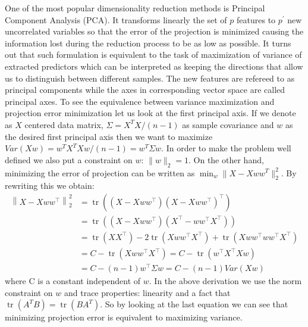 \documentclass[shortabstract, english, mgr]{iithesis}
\begin{document}
One of the most popular dimensionality reduction methods is Principal Component Analysis (PCA). It transforms linearly the set of $p$ features to $p^{\prime}$ new uncorrelated variables so that the error of the projection is minimized causing the information lost during the reduction process to be as low as possible. It turns out that such formulation is equivalent to the task of maximization of variance of extracted predictors which can be interpreted as keeping the directions that allow us to distinguish between different samples. The new features are refereed to as principal components while the axes in corresponding vector space are called principal axes. To see the equivalence between variance maximization and projection error minimization let us look at the first principal axis. If we denote as $X$ centered data matrix, $\Sigma = X^TX/(n-1)$ as sample covariance and $w$ as the desired first principal axis then we want to maximize $Var(Xw) = w^TX^TXw/(n-1) = w^T\Sigma w$. In order to make the problem well defined we also put a constraint on $w$: $\|w\|_2 = 1$. On the other hand, minimizing the error of projection can be written as $\min_w \| X - X ww^T\|_2^2$. By rewriting this we obtain: 
\begin{align*}
\left\|X-X w w^{\top}\right\|^{2}_2 &=\operatorname{tr}\left(\left(X-X w w^{\top}\right)\left(X-X w w^{\top}\right)^{\top}\right) \\ &=\operatorname{tr}\left(\left(X-X w w^{\top}\right)\left(X^{\top}-w w^{\top} X^{\top}\right)\right) \\ &=\operatorname{tr}\left(X X^{\top}\right)-2 \operatorname{tr}\left(X w w^{\top} X^{\top}\right)+\operatorname{tr}\left(X w w^{\top} w w^{\top} X^{\top}\right) \\ &=C-\operatorname{tr}\left(X w w^{\top} X^{\top}\right)=C-\operatorname{tr}\left(w^{\top} X^{\top} X w\right) \\ &=C-(n-1)w^{\top} \Sigma w = C - (n-1)Var(Xw)
\end{align*} where C is a constant independent of $w$. In the above derivation we use the norm constraint on $w$ and trace properties: linearity and a fact that $\operatorname{tr}\left(A^TB\right) = \operatorname{tr}\left(BA^T\right)$. So by looking at the last equation we can see that minimizing projection error is equivalent to maximizing variance. 
\end{document}
